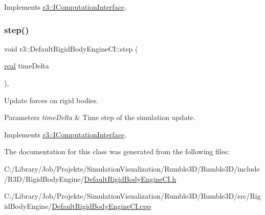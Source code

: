 Implements \mbox{\hyperlink{classr3_1_1_i_computation_interface_a6069989c54ffd4e714788d0968851007}{r3\+::\+I\+Computation\+Interface}}.

\mbox{\label{classr3_1_1_default_rigid_body_engine_c_i_ac45ae1d1889c75e6839b865870cbf59c}} 
\subsubsection{\texorpdfstring{step()}{step()}}
{\footnotesize\ttfamily void r3\+::\+Default\+Rigid\+Body\+Engine\+C\+I\+::step (\begin{DoxyParamCaption}\item[{\mbox{\hyperlink{namespacer3_ab2016b3e3f743fb735afce242f0dc1eb}{real}}}]{time\+Delta }\end{DoxyParamCaption})\hspace{0.3cm}{\ttfamily [override]}, {\ttfamily [virtual]}}



Update forces on rigid bodies. 


\begin{DoxyParams}{Parameters}
{\em time\+Delta} & Time step of the simulation update. \\
\hline
\end{DoxyParams}


Implements \mbox{\hyperlink{classr3_1_1_i_computation_interface_aaa12bcc35005f32a1984b38de97696cb}{r3\+::\+I\+Computation\+Interface}}.



The documentation for this class was generated from the following files\+:\begin{DoxyCompactItemize}
\item 
C\+:/\+Library/\+Job/\+Projekte/\+Simulation\+Visualization/\+Rumble3\+D/\+Rumble3\+D/include/\+R3\+D/\+Rigid\+Body\+Engine/\mbox{\hyperlink{_default_rigid_body_engine_c_i_8h}{Default\+Rigid\+Body\+Engine\+C\+I.\+h}}\item 
C\+:/\+Library/\+Job/\+Projekte/\+Simulation\+Visualization/\+Rumble3\+D/\+Rumble3\+D/src/\+Rigid\+Body\+Engine/\mbox{\hyperlink{_default_rigid_body_engine_c_i_8cpp}{Default\+Rigid\+Body\+Engine\+C\+I.\+cpp}}\end{DoxyCompactItemize}

